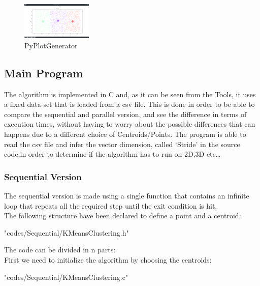 \documentclass[10pt,twocolumn,letterpaper]{article}
\begin{document}
\begin{figure}[H]
\centering
\includegraphics[width=0.3\textwidth]{Py_Plot_Generator}
\caption{PyPlotGenerator}
\end{figure}


\subsection{Main Program}
The algorithm is implemented in C and, as it can be seen from the Tools, it uses a fixed data-set that is loaded from a csv file.
\newline
This is done in order to be able to compare the sequential and parallel version, and see the difference in terms of execution times,
without having to worry about the possible differences that can happens due to a different choice of Centroids/Points.
\newline
The program is able to read the csv file and infer the vector dimension, called `Stride' in the source code,in order to determine if the 
algorithm has to run on 2D,3D etc\ldots \newline
\subsubsection{Sequential Version}
The sequential version is made using a single function that contains an infinite loop that repeats all the required step until the exit
condition is hit.\\
The following structure have been declared to define a point and a centroid:
\begin{lstinputlisting}[language=C,style=CSnippetStyle,caption=Data Structure Definition ]{
	"codes/Sequential/KMeansClustering.h"}
\end{lstinputlisting}
The code can be divided in n parts:\\

First we need to initialize the algorithm by choosing the centroids:\\

\begin{lstinputlisting}[language=C,style=CSnippetStyle,caption=Centroids Initialization,firstline=54,lastline=61 ]{
	"codes/Sequential/KMeansClustering.c"}
\end{lstinputlisting}
\end{document}
